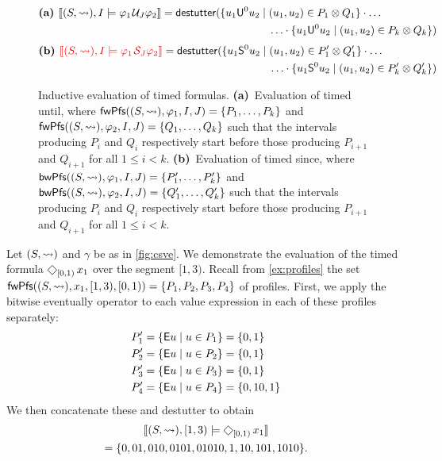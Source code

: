 \begin{figure*}[!t]
	\begin{align*}
		\textbf{(a) }
		\llbracket (S, {\hb}), I \models \varphi_1 \until_J \varphi_2 \rrbracket = \destutter( \{ u_1 \mathsf{U}^0 u_2 \st &(u_1, u_2) \in P_1 \otimes Q_1 \} \cdot \ldots \\ 
		&\ldots \cdot \{ u_1 \mathsf{U}^0 u_2 \st (u_1, u_2) \in P_k \otimes Q_k \} )
	\end{align*}
	\begin{align*}
		\textbf{(b) }
		\bgroup \color{red} \llbracket (S, {\hb}), I \models \varphi_1 \since_J \varphi_2 \rrbracket \egroup = \destutter( \{ u_1 \mathsf{S}^0 u_2 \st &(u_1, u_2) \in P_1' \otimes Q_1' \} \cdot \ldots \\ 
		&\ldots \cdot \{ u_1 \mathsf{S}^0 u_2 \st (u_1, u_2) \in P_k' \otimes Q_k' \} )
	\end{align*}
	\caption{Inductive evaluation of timed formulas.
		\textbf{(a)}~Evaluation of timed until, where $\mathsf{fwPfs}((S,{\rightsquigarrow}), \varphi_1, I, J) = \{P_1, \ldots, P_k \}$ and $\mathsf{fwPfs}((S,{\rightsquigarrow}), \varphi_2, I, J) = \{Q_1, \ldots, Q_k \}$ such that the intervals producing $P_i$ and $Q_i$ respectively start before those producing $P_{i+1}$ and $Q_{i+1}$ for all $1 \leq i < k$.
		\textbf{(b)}~Evaluation of timed since, where $\mathsf{bwPfs}((S,{\rightsquigarrow}), \varphi_1, I, J) = \{P_1', \ldots, P_k' \}$ and $\mathsf{bwPfs}((S,{\rightsquigarrow}), \varphi_2, I, J) = \{Q_1', \ldots, Q_k' \}$ such that the intervals producing $P_i$ and $Q_i$ respectively start before those producing $P_{i+1}$ and $Q_{i+1}$ for all $1 \leq i < k$.
		\label{fig:timedEval}}
\end{figure*}

\begin{example} \label{ex:timed}
	Let $(S, {\rightsquigarrow})$ and $\gamma$ be as in \cref{fig:csve}.
	We demonstrate the evaluation of the timed formula $\LTLeventually_{[0,1)} x_1$ over the segment $[1,3)$.
	Recall from \cref{ex:profiles} the set $\mathsf{fwPfs}((S,{\rightsquigarrow}), x_1, [1,3), [0,1)) = \{P_1, P_2, P_3, P_4\}$ of profiles.
	First, we apply the bitwise eventually operator to each value expression in each of these profiles separately:
	\begin{align*}
		P_1' &= \{ \mathsf{E} u \st u \in P_1 \} = \{ 0, 1 \} \\
		P_2' &= \{ \mathsf{E} u \st u \in P_2 \} = \{ 0, 1 \} \\
		P_3' &= \{ \mathsf{E} u \st u \in P_3 \} = \{ 0, 1 \} \\
		P_4' &= \{ \mathsf{E} u \st u \in P_4 \} = \{ 0, 10, 1 \} \\
	\end{align*}
	We then concatenate these and destutter to obtain 
	\begin{multline*}
		\llbracket (S, {\hb}), [1,3) \models \LTLeventually_{[0,1)} x_1 \rrbracket \\= \{ 0, 01, 010, 0101, 01010, 1, 10, 101, 1010 \}. 
	\end{multline*}
\end{example}

